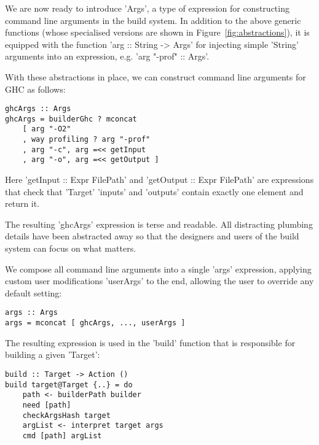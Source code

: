 We are now ready to introduce \lst'Args', a type of expression for
constructing command line arguments in the build system. In addition to the
above generic functions (whose specialised versions are shown in
Figure~\ref{fig:abstractions}), it is equipped with the function
\lst'arg :: String -> Args' for injecting simple \lst'String' arguments into
an expression, e.g. \lst'arg "-prof" :: Args'.

With these abstractions in place, we can construct command
line arguments for GHC as follows:

\begin{lstlisting}
ghcArgs :: Args
ghcArgs = builderGhc ? mconcat
    [ arg "-O2"
    , way profiling ? arg "-prof"
    , arg "-c", arg =<< getInput
    , arg "-o", arg =<< getOutput ]
\end{lstlisting}

\noindent Here \lst'getInput :: Expr FilePath' and
\lst'getOutput :: Expr FilePath' are expressions that check that
\lst'Target' \lst'inputs' and \lst'outputs' contain exactly one element and
return it.

The resulting \lst'ghcArgs' expression is terse and readable. All
distracting plumbing details have been abstracted away so that the designers and
users of the build system can focus on what matters.


We compose all command line arguments into a single \lst'args' expression,
applying custom user modifications \lst'userArgs' to the end,
allowing the user to override any default setting:

\begin{lstlisting}
args :: Args
args = mconcat [ ghcArgs, ..., userArgs ]
\end{lstlisting}

The resulting expression is used in the \lst'build' function that is responsible
for building a given \lst'Target':

\begin{lstlisting}
build :: Target -> Action ()
build target@Target {..} = do
    path <- builderPath builder
    need [path]
    checkArgsHash target
    argList <- interpret target args
    cmd [path] argList
\end{lstlisting}

